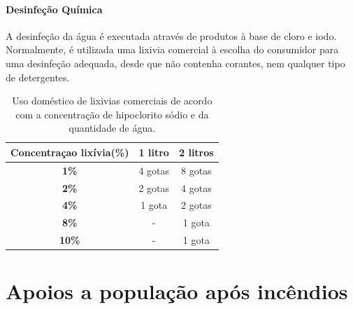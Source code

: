 \documentclass[a4paper,11pt]{report}
\begin{document}
\subsection{Desinfeção Química}
A desinfeção da água é executada através de produtos à base de cloro e iodo. Normalmente, é utilizada uma lixivia comercial à escolha do consumidor para uma desinfeção adequada, desde que não contenha corantes, nem qualquer tipo de detergentes. 
\begin{table}
\begin{tabular}{|c||c||c|}
\hline
\textbf{Concentraçao lixívia(\%)}     &  \textbf{1 litro}  &  \textbf{2 litros}  \\ \hline
	\textbf{1\%}		      &  4 gotas	   &  8 gotas   \\ \hline
	\textbf{2\%}		      &	 2 gotas	   &  4 gotas   \\ \hline
	\textbf{4\%}		      &  1 gota	     	   &  2 gotas   \\ \hline
	\textbf{8\%}		      &     -    	   &  1 gota    \\ \hline
	\textbf{10\%}		      &     -    	   &  1 gota    \\ \hline
\end{tabular}
\caption{Uso doméstico de lixivias comerciais de acordo com a concentração de hipoclorito sódio e da quantidade de água.}
\end{table}



\part{Apoios a população após incêndios}
\end{document}
